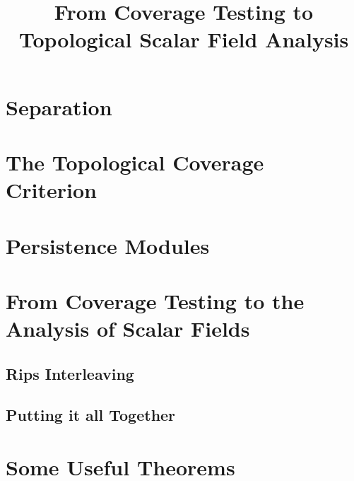 \documentclass[12pt]{article}
\begin{document}
\title{From Coverage Testing to Topological Scalar Field Analysis}




% 

\section{Separation}


\clearpage
\section{The Topological Coverage Criterion}


\clearpage

\section{Persistence Modules}


\section{From Coverage Testing to the Analysis of Scalar Fields}


\subsection{Rips Interleaving}


\subsection{Putting it all Together}


\clearpage
\appendix
\section{Some Useful Theorems}





\end{document}
